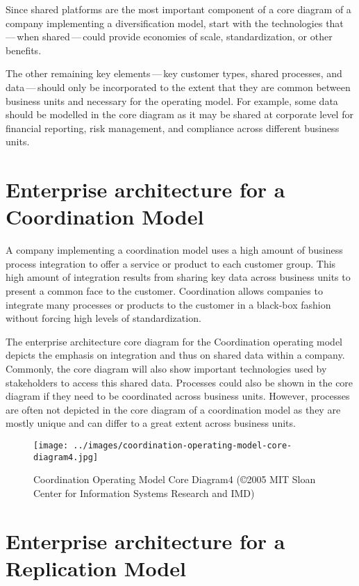 Since shared platforms are the most important component of a core diagram of a company implementing a
diversification model, start with the technologies that\,---\,when shared\,---\,could provide economies of scale,
standardization, or other benefits.

The other remaining key elements\,---\,key customer types, shared processes, and data\,---\,should only be incorporated
to the extent that they are common between business units and necessary for the operating model.
For example, some data should be modelled in the core diagram as it may be shared at corporate level for
financial reporting, risk management, and compliance across different business units.

\section*{Enterprise architecture for a Coordination Model}

A company implementing a coordination model uses a high amount of business process integration to offer a service
or product to each customer group.
This high amount of integration results from sharing key data across business units to present a common face to
the customer.
Coordination allows companies to integrate many processes or products to the customer in a black-box fashion without
forcing high levels of standardization.

The enterprise architecture core diagram for the Coordination operating model depicts the emphasis on integration
and thus on shared data within a company.
Commonly, the core diagram will also show important technologies used by stakeholders to access this shared data.
Processes could also be shown in the core diagram if they need to be coordinated across business units.
However, processes are often not depicted in the core diagram of a coordination model as they are mostly unique
and can differ to a great extent across business units.

\begin{figure}[ht]
    \centering
    \texttt{[image: ../images/coordination-operating-model-core-diagram4.jpg]}
    \caption{Coordination Operating Model Core Diagram4 (©2005 MIT Sloan Center for Information Systems Research and IMD)}
    \label{fig:ekgmm-ea-coordination-operating-model-core-diagram4}
\end{figure}

\section*{Enterprise architecture for a Replication Model}

